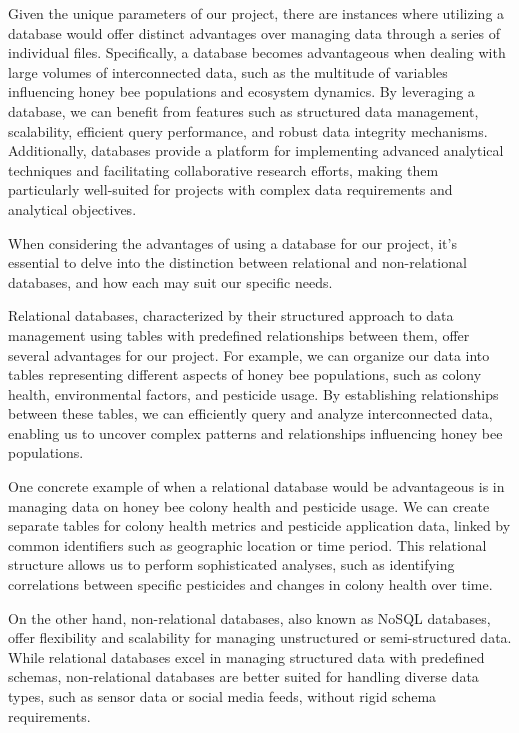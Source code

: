 \documentclass[
  letterpaper,
  DIV=11,
  numbers=noendperiod]{scrartcl}
\begin{document}
Given the unique parameters of our project, there are instances where
utilizing a database would offer distinct advantages over managing data
through a series of individual files. Specifically, a database becomes
advantageous when dealing with large volumes of interconnected data,
such as the multitude of variables influencing honey bee populations and
ecosystem dynamics. By leveraging a database, we can benefit from
features such as structured data management, scalability, efficient
query performance, and robust data integrity mechanisms. Additionally,
databases provide a platform for implementing advanced analytical
techniques and facilitating collaborative research efforts, making them
particularly well-suited for projects with complex data requirements and
analytical objectives.

When considering the advantages of using a database for our project,
it's essential to delve into the distinction between relational and
non-relational databases, and how each may suit our specific needs.

Relational databases, characterized by their structured approach to data
management using tables with predefined relationships between them,
offer several advantages for our project. For example, we can organize
our data into tables representing different aspects of honey bee
populations, such as colony health, environmental factors, and pesticide
usage. By establishing relationships between these tables, we can
efficiently query and analyze interconnected data, enabling us to
uncover complex patterns and relationships influencing honey bee
populations.

One concrete example of when a relational database would be advantageous
is in managing data on honey bee colony health and pesticide usage. We
can create separate tables for colony health metrics and pesticide
application data, linked by common identifiers such as geographic
location or time period. This relational structure allows us to perform
sophisticated analyses, such as identifying correlations between
specific pesticides and changes in colony health over time.

On the other hand, non-relational databases, also known as NoSQL
databases, offer flexibility and scalability for managing unstructured
or semi-structured data. While relational databases excel in managing
structured data with predefined schemas, non-relational databases are
better suited for handling diverse data types, such as sensor data or
social media feeds, without rigid schema requirements.
\end{document}
